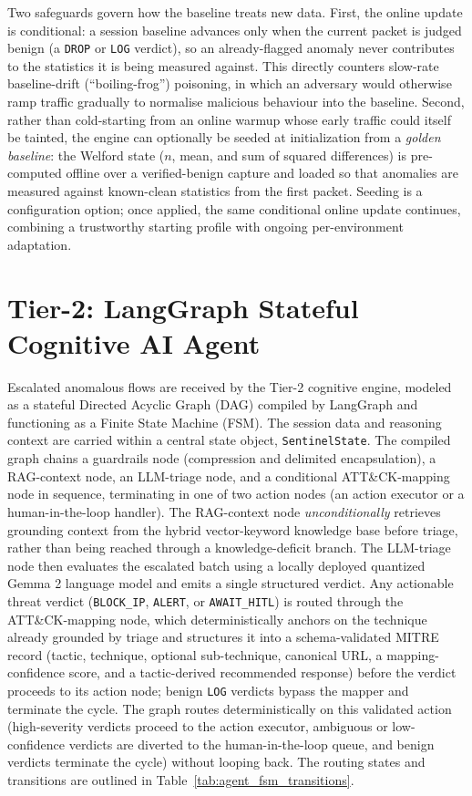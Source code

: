 Two safeguards govern how the baseline treats new data. First, the online update is conditional: a session baseline advances only when the current packet is judged benign (a \texttt{DROP} or \texttt{LOG} verdict), so an already-flagged anomaly never contributes to the statistics it is being measured against. This directly counters slow-rate baseline-drift (``boiling-frog'') poisoning, in which an adversary would otherwise ramp traffic gradually to normalise malicious behaviour into the baseline. Second, rather than cold-starting from an online warmup whose early traffic could itself be tainted, the engine can optionally be seeded at initialization from a \emph{golden baseline}: the Welford state ($n$, mean, and sum of squared differences) is pre-computed offline over a verified-benign capture and loaded so that anomalies are measured against known-clean statistics from the first packet. Seeding is a configuration option; once applied, the same conditional online update continues, combining a trustworthy starting profile with ongoing per-environment adaptation.

\section{Tier-2: LangGraph Stateful Cognitive AI Agent}

Escalated anomalous flows are received by the Tier-2 cognitive engine, modeled as a stateful Directed Acyclic Graph (DAG) compiled by LangGraph \cite{langgraph2024} and functioning as a Finite State Machine (FSM). The session data and reasoning context are carried within a central state object, \texttt{SentinelState}. The compiled graph chains a guardrails node (compression and delimited encapsulation), a RAG-context node, an LLM-triage node, and a conditional ATT\&CK-mapping node in sequence, terminating in one of two action nodes (an action executor or a human-in-the-loop handler). The RAG-context node \emph{unconditionally} retrieves grounding context from the hybrid vector-keyword knowledge base before triage, rather than being reached through a knowledge-deficit branch. The LLM-triage node then evaluates the escalated batch using a locally deployed quantized Gemma 2 language model \cite{gemma_2_2024} and emits a single structured verdict. Any actionable threat verdict (\texttt{BLOCK\_IP}, \texttt{ALERT}, or \texttt{AWAIT\_HITL}) is routed through the ATT\&CK-mapping node, which deterministically anchors on the technique already grounded by triage and structures it into a schema-validated MITRE record (tactic, technique, optional sub-technique, canonical URL, a mapping-confidence score, and a tactic-derived recommended response) before the verdict proceeds to its action node; benign \texttt{LOG} verdicts bypass the mapper and terminate the cycle. The graph routes deterministically on this validated action (high-severity verdicts proceed to the action executor, ambiguous or low-confidence verdicts are diverted to the human-in-the-loop queue, and benign verdicts terminate the cycle) without looping back. The routing states and transitions are outlined in Table~\ref{tab:agent_fsm_transitions}.

